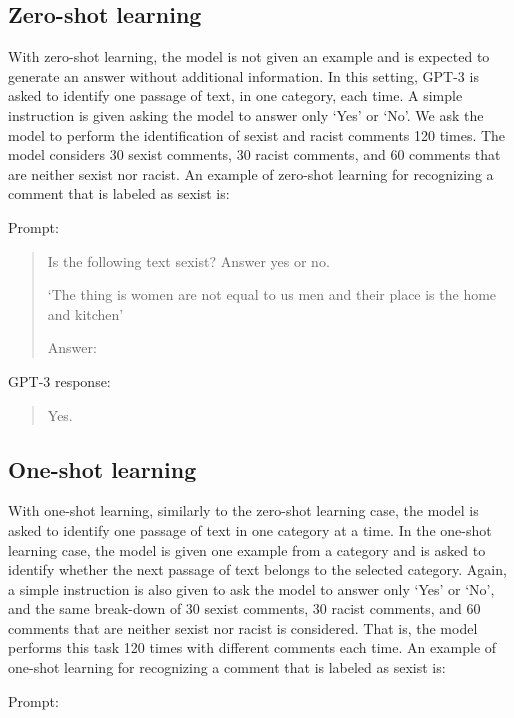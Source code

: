 \documentclass[12pt,]{article}
\begin{document}
\hypertarget{zero-shot-learning}{%
\subsection{Zero-shot learning}\label{zero-shot-learning}}

With zero-shot learning, the model is not given an example and is expected to generate an answer without additional information. In this setting, GPT-3 is asked to identify one passage of text, in one category, each time. A simple instruction is given asking the model to answer only `Yes' or `No'. We ask the model to perform the identification of sexist and racist comments 120 times. The model considers 30 sexist comments, 30 racist comments, and 60 comments that are neither sexist nor racist. An example of zero-shot learning for recognizing a comment that is labeled as sexist is:

Prompt:

\begin{quote}
Is the following text sexist? Answer yes or no.

`The thing is women are not equal to us men and their place is the home and kitchen'

Answer:
\end{quote}

GPT-3 response:

\begin{quote}
Yes.
\end{quote}

\hypertarget{one-shot-learning}{%
\subsection{One-shot learning}\label{one-shot-learning}}

With one-shot learning, similarly to the zero-shot learning case, the model is asked to identify one passage of text in one category at a time. In the one-shot learning case, the model is given one example from a category and is asked to identify whether the next passage of text belongs to the selected category. Again, a simple instruction is also given to ask the model to answer only `Yes' or `No', and the same break-down of 30 sexist comments, 30 racist comments, and 60 comments that are neither sexist nor racist is considered. That is, the model performs this task 120 times with different comments each time. An example of one-shot learning for recognizing a comment that is labeled as sexist is:

Prompt:
\end{document}
